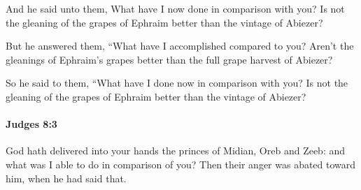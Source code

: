 			\begin{versebox}
					\item[BHS] 
					\item[ASV] And he said unto them, What have I now done in comparison with you? Is not the gleaning of the grapes of Ephraim better than the vintage of Abiezer?
					\item[NIV] But he answered them, “What have I accomplished compared to you? Aren’t the gleanings of Ephraim’s grapes better than the full grape harvest of Abiezer?
					\item[NRSV] So he said to them, “What have I done now in comparison with you? Is not the gleaning of the grapes of Ephraim better than the vintage of Abiezer?
			\end{versebox}

		\paragraph{Judges 8:3} %
			\label{JUDGES-8-3}

			God hath delivered into your hands the princes of Midian, Oreb and Zeeb: and what was I able to do in comparison of you? Then their anger was abated toward him, when he had said that.

